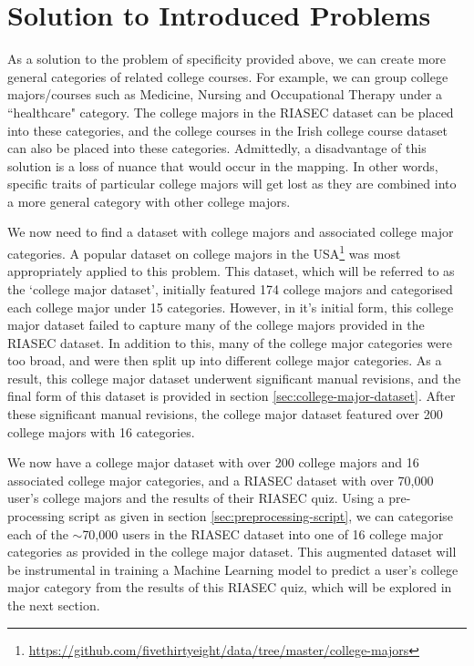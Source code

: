 \section{Solution to Introduced Problems}

As a solution to the problem of specificity provided above, we can create more general categories of related college courses.
For example, we can 
group college majors/courses such as Medicine, Nursing and Occupational Therapy under a ``healthcare" category.
The college majors in the RIASEC dataset can be placed into these categories,
and the college courses in the Irish college course dataset can also be placed into these categories.
Admittedly, a disadvantage of this solution is a loss of nuance that would occur in the mapping.
In other words, specific traits of particular college majors 
will get lost as they are combined into a more general category with other college majors.

We now need to find a dataset with college majors and associated college major categories.
A popular dataset on college majors in the USA\footnote{\url{https://github.com/fivethirtyeight/data/tree/master/college-majors}} 
was most appropriately applied to this problem. This dataset, which will be referred to as the `college major dataset', initially featured 174 college majors and categorised each college major 
under 15 categories.
However, in it's initial form, this college major dataset failed to capture many of the college majors provided in the RIASEC dataset.
In addition to this, many of the college major categories were too broad, and were then split up into different college major categories.
As a result, this college major dataset underwent significant manual revisions, and the final form of this dataset is provided in section \ref{sec:college-major-dataset}.
After these significant manual revisions, the college major dataset featured over 200 college majors with 16 categories.

We now have a college major dataset with over 200 college majors and 16 associated college major categories, 
and a RIASEC dataset with over 70,000 user's college majors and the results of their RIASEC quiz.
Using a pre-processing script as given in section \ref{sec:preprocessing-script},
we can categorise each of the $\sim$70,000 users in the RIASEC dataset into one of 16 college major categories as provided in the college major dataset.
This augmented dataset will be instrumental in training a Machine Learning model to predict a user's college major category from the results
of this RIASEC quiz, which will be explored in the next section.

